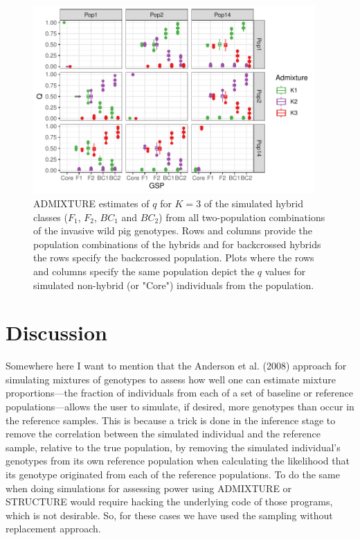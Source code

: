 {%
\begin{figure}
\newcommand{\pigsimsqscap}{\footnotesize ADMIXTURE estimates of $q$ for $K=3$ of the simulated hybrid classes 
($F_1$, $F_2$, $BC_1$ and $BC_2$) from all two-population combinations of the invasive wild pig genotypes. 
Rows and columns provide the population combinations of the hybrids and for backcrossed hybrids the rows 
specify the backcrossed population. Plots where the rows and columns specify the same population depict the 
$q$ values for simulated non-hybrid (or "Core") individuals from the population.}
\includegraphics[width=0.96\textwidth]{figures/simulated-pigs-Q-facet.pdf}
\caption[\pigsimsqscap]{\pigsimsqscap}
\label{fig:pig-sim-qs}
\end{figure}

\section*{Discussion}

Somewhere here I want to mention that the Anderson et al. (2008) approach for simulating
mixtures of genotypes to assess how well one can estimate mixture proportions---the fraction
of individuals from each of a set of baseline or reference populations---allows the user to
simulate, if desired, more genotypes than occur in the reference samples.  This is because
a trick is done in the inference stage to remove the correlation between the simulated individual
and the reference sample, relative to the true population, by removing the simulated individual's
genotypes from its own reference population when calculating the likelihood that its genotype
originated from each of the reference populations.  To do the same when doing simulations for
assessing power using ADMIXTURE or STRUCTURE would require hacking the underlying code
of those programs, which is not desirable.  So, for these cases we have used the sampling
without replacement approach.



}
